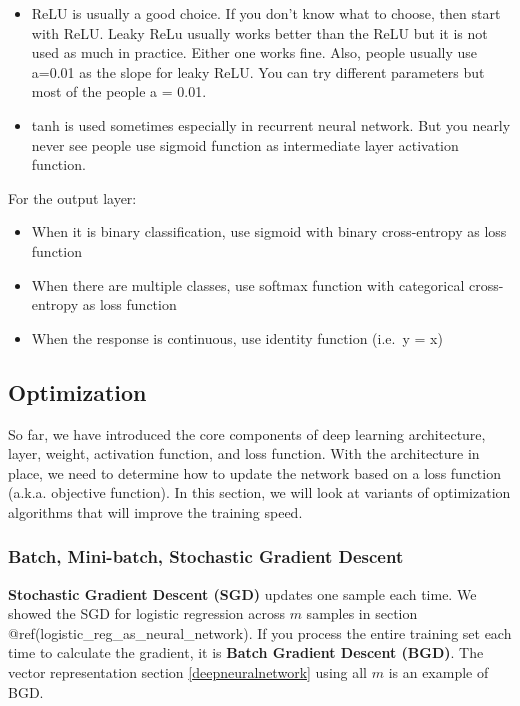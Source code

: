\documentclass[12pt,]{krantz}
\providecommand{\tightlist}{%
  \setlength{\itemsep}{0pt}\setlength{\parskip}{0pt}}
\begin{document}
\begin{itemize}
\tightlist
\item
  ReLU is usually a good choice. If you don't know what to choose, then start with ReLU. Leaky ReLu usually works better than the ReLU but it is not used as much in practice. Either one works fine. Also, people usually use a=0.01 as the slope for leaky ReLU. You can try different parameters but most of the people a = 0.01.
\item
  tanh is used sometimes especially in recurrent neural network. But you nearly never see people use sigmoid function as intermediate layer activation function.
\end{itemize}

For the output layer:

\begin{itemize}
\tightlist
\item
  When it is binary classification, use sigmoid with binary cross-entropy as loss function
\item
  When there are multiple classes, use softmax function with categorical cross-entropy as loss function
\item
  When the response is continuous, use identity function (i.e.~y = x)
\end{itemize}

\hypertarget{optimization}{%
\subsection{Optimization}\label{optimization}}

So far, we have introduced the core components of deep learning architecture, layer, weight, activation function, and loss function. With the architecture in place, we need to determine how to update the network based on a loss function (a.k.a. objective function). In this section, we will look at variants of optimization algorithms that will improve the training speed.

\hypertarget{batch-mini-batch-stochastic-gradient-descent}{%
\subsubsection{Batch, Mini-batch, Stochastic Gradient Descent}\label{batch-mini-batch-stochastic-gradient-descent}}

\textbf{Stochastic Gradient Descent (SGD)} updates one sample each time. We showed the SGD for logistic regression across \(m\) samples in section @ref(logistic\_reg\_as\_neural\_network). If you process the entire training set each time to calculate the gradient, it is \textbf{Batch Gradient Descent (BGD)}. The vector representation section \ref{deepneuralnetwork} using all \(m\) is an example of BGD.
\end{document}

